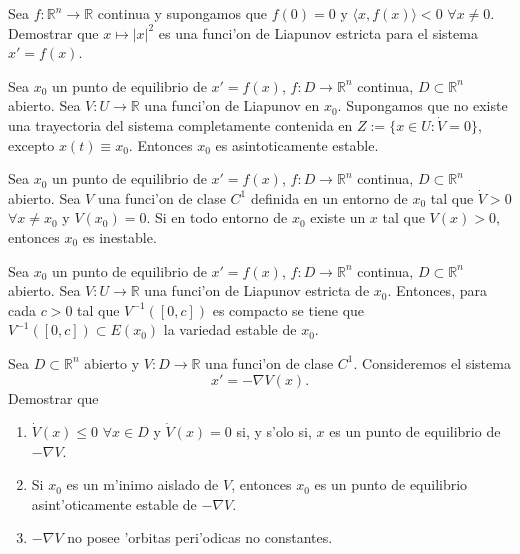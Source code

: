 \begin{ejercicio}{} Sea $f:\mathbb{R}^n\to\mathbb{R}$ continua y
supongamos que $f(0)=0$ y $\langle x,f(x)\rangle<0$ $\forall x\neq
0$. Demostrar que $x\mapsto |x|^2$ es una funci'on de Liapunov
estricta para el sistema $x'=f(x)$.

\end{ejercicio}

\begin{ejercicio}{}
Sea $x_0$ un punto de equilibrio de $x'=f(x)$,
$f:D\to\mathbb{R}^n$ continua, $D\subset\mathbb{R}^n$ abierto. Sea
$V:U\to\mathbb{R}$ una funci'on de Liapunov en $x_0$. Supongamos
que no existe una trayectoria del sistema completamente contenida
en $Z:=\{x\in U:\dot{V}=0\}$, excepto $x(t)\equiv x_0$. Entonces
$x_0$ es asintoticamente estable.

\end{ejercicio}


\begin{ejercicio}{}
Sea $x_0$ un punto de equilibrio de $x'=f(x)$,
 $f:D\to\mathbb{R}^n$ continua, $D\subset\mathbb{R}^n$ abierto.
 Sea $V$ una funci'on de clase $C^1$ definida en un entorno de
 $x_0$ tal que $\dot{V}>0$ $\forall x\neq x_0$ y $V(x_0)=0$. Si en
 todo entorno de $x_0$ existe un $x$ tal que $V(x)>0$, entonces
 $x_0$ es inestable.

\end{ejercicio}

\begin{ejercicio}{}
Sea $x_0$ un punto de equilibrio de $x'=f(x)$,
$f:D\to\mathbb{R}^n$ continua, $D\subset\mathbb{R}^n$ abierto. Sea
$V:U\to\mathbb{R}$ una funci'on de Liapunov estricta de $x_0$.
Entonces, para cada $c>0$ tal que $V^{-1}([0,c])$ es compacto se
tiene que $V^{-1}([0,c])\subset E(x_0)$ la variedad estable de
$x_0$.

\end{ejercicio}

\begin{ejercicio}{} Sea $D\subset\mathbb{R}^n$ abierto y
$V:D\to\mathbb{R}$ una funci'on de clase $C^1$. Consideremos el
sistema
\[
    x'=-\nabla V(x).
\]
Demostrar que
\begin{enumerate}
    \item   $\dot{V}(x)\leq 0$ $\forall x\in D$ y $\dot{V}(x)=0$
    si, y s'olo si, $x$ es un punto de equilibrio de $-\nabla
    V$.
    \item Si $x_0$ es un m'inimo aislado de $V$, entonces $x_0$ es
    un punto de equilibrio asint'oticamente estable de $-\nabla V$.
    \item $-\nabla V$ no posee 'orbitas peri'odicas no constantes.
\end{enumerate}
\end{ejercicio}

